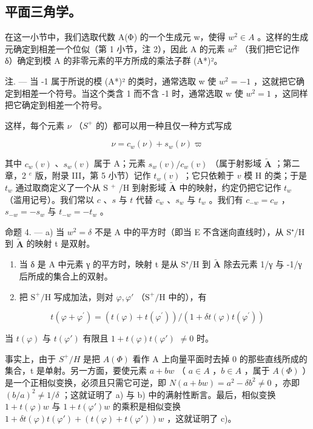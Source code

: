 \subsection{平面三角学。}

在这一小节中，我们选取代数 A(Φ) 的一个生成元 w，使得 \(w^{2} \in A\) 。这样的生成元确定到相差一个位似（第 1 小节，注 2），因此 A 的元素 \(w^{2}\) （我们把它记作 δ）确定到模 A 的非零元素的平方所成的乘法子群 (A*)²。

注. — 当 -1 属于所说的模 (A*)² 的类时，通常选取 w 使 \(w^{2} = -1\) ，这就把它确定到相差一个符号。当这个类含 1 而不含 -1 时，通常选取 w 使 \(w^{2} = 1\) ，这同样把它确定到相差一个符号。

这样，每个元素 \(\nu\) （\(S^{+}\) 的）都可以用一种且仅一种方式写成

\[
\nu = c _ {w} (\nu) + s _ {w} (\nu) \varpi\tag{1}
\]

其中 \(c_w(v)\) 、\(s_w(v)\) 属于 A；元素 \(s_w(v)/c_w(v)\) （属于射影域 \(\tilde{\mathbf{A}}\) ；第二章，2 \(^{e}\) 版，附录 III，第 5 小节）记作 \(t_w(v)\) ；它只依赖于 \(v\) 模 H 的类；于是 \(t_w\) 通过取商定义了一个从 S \(^{+}\) /H 到射影域 \(\tilde{\mathbf{A}}\) 中的映射，约定仍把它记作 \(t_w\) （滥用记号）。我们常以 \(c\) 、\(s\) 与 \(t\) 代替 \(c_w\) 、\(s_w\) 与 \(t_w\) 。我们有 \(c_{-w} = c_w\) ，\(s_{-w} = -s_w\) 与 \(t_{-w} = -t_w\) 。

命题 4. — a) 当 \(w^2 = \delta\) 不是 A 中的平方时（即当 E 不含迷向直线时），从 S⁺/H 到 \(\tilde{\mathbf{A}}\) 的映射 t 是双射。

\begin{enumerate}
\def\labelenumi{\alph{enumi})}
\setcounter{enumi}{1}
\item
  当 δ 是 A 中元素 γ 的平方时，映射 t 是从 S⁺/H 到 \(\tilde{\mathbf{A}}\) 除去元素 1/γ 与 -1/γ 后所成的集合上的双射。
\item
  把 \(\mathrm{S}^{+}/\mathrm{H}\) 写成加法，则对 \(\varphi, \varphi'\) （\(\mathrm{S}^{+}/\mathrm{H}\) 中的），有
\end{enumerate}

\[
t (\varphi + \varphi^ {\prime}) = (t (\varphi) + t (\varphi^ {\prime})) / (1 + \delta t (\varphi) t (\varphi^ {\prime}))\tag{2}
\]

当 \(t(\varphi)\) 与 \(t(\varphi')\) 有限且 \(1 + t(\varphi)t(\varphi')\) \(\neq 0\) 时。

事实上，由于 \(S^{+}/H\) 是把 \(A(\Phi)\) 看作 A 上向量平面时去掉 0 的那些直线所成的集合，t 是单射。另一方面，要使元素 \(a + bw\) （ \(a \in A\) ，\(b \in A\) ，属于 \(A(\Phi)\) ）是一个正相似变换，必须且只需它可逆，即 \(N(a + bw) = a^{2} - \delta b^{2} \neq 0\) ，亦即 \((b/a)^{2} \neq 1/\delta\) ；这就证明了 a) 与 b) 中的满射性断言。最后，相似变换 \(1 + t(\varphi)w\) 与 \(1 + t(\varphi')w\) 的乘积是相似变换 \(1 + \delta t(\varphi)t(\varphi') + (t(\varphi) + t(\varphi'))w\) ，这就证明了 c)。

